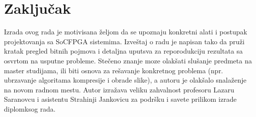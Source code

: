 \section{Zaključak}
Izrada ovog rada je motivisana željom da se upoznaju konkretni alati i postupak projektovanja sa SoCFPGA sistemima. Izveštaj o radu je napisan tako da pruži kratak pregled bitnih pojmova i detaljna uputsva za reporodukciju rezultata sa osvrtom na usputne probleme. Stečeno znanje moze olakšati slušanje predmeta na master studijama, ili biti osnova za rešavanje konkretnog problema (npr. ubrzavanje algoritama kompresije i obrade slike), a autoru je olakšalo snalaženje na novom radnom mestu. Autor izražava veliku zahvalnost profesoru Lazaru Saranovcu i asistentu Strahinji Jankovicu za podršku i savete prilikom izrade diplomksog rada.
